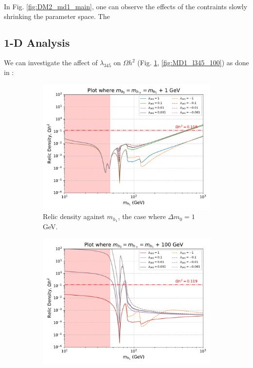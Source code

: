 \documentclass[12pt]{article}
\begin{document}
In Fig. \ref{fig:DM2_md1_main}, one can observe the effects of the contraints slowly shrinking the parameter space. The

\subsection{1-D Analysis}
\label{1-D scan}
We can investigate the affect of $\lambda_{345}$ on $\Omega h^2$ (Fig. \ref{fig:MD1_l345_1}, \ref{fig:MD1_l345_100}) as done in \cite{Belyaev:2016lok}:
\begin{figure}[ht]
    \centering
    \begin{subfigure}[b]{0.49\textwidth}
        \centering
        \includegraphics[width=\textwidth]{plots/plot_MD1_l345+1.pdf}
        \caption{Relic density against $m_{h_1}$, the case where $\Delta m_0 = 1$ GeV.}
        \label{fig:MD1_l345_1}
    \end{subfigure}
    \hfill
    \begin{subfigure}[b]{0.49\textwidth}
        \centering
        \includegraphics[width=\textwidth]{plots/plot_MD1_l345+100.pdf}

\end{subfigure}
\end{figure}
\end{document}
